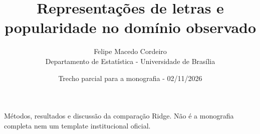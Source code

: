 \documentclass[12pt,a4paper,oneside]{article}
\title{Representações de letras e popularidade no domínio observado}
\author{Felipe Macedo Cordeiro\\Departamento de Estatística - Universidade de Brasília}
\date{Trecho parcial para a monografia - 02/11/2026}
\begin{document}
\maketitle
\noindent Métodos, resultados e discussão da comparação Ridge. Não é a monografia completa nem um template institucional oficial.

\clearpage

\end{document}
